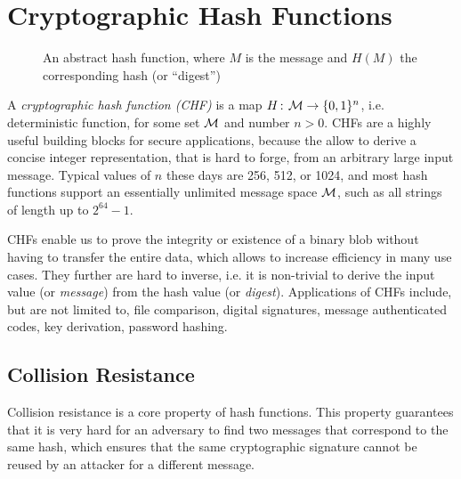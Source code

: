 \section{Cryptographic Hash Functions}
\label{sec:hashfunctions}

\begin{figure}
  \centering
    \caption{An abstract hash function, where $M$ is the message and $H(M)$ the corresponding hash (or ``digest'')}
\label{fig:hash-function}
\end{figure}

A \emph{cryptographic hash function (CHF)} is a map $H{{\kern .05em}\colon{\kern .05em}}{\cal M}\rightarrow\{0,1\}^n$, i.e. deterministic function, for
some set ${\cal M}$ and number $n > 0$. 
CHFs are a highly useful building blocks for secure applications, because the allow to derive a concise integer representation, that is hard to forge, from an arbitrary large input message.
Typical values of $n$ these days are 256, 512, or 1024, and most hash functions support an essentially unlimited message space ${\cal M}$, such as all strings of length up to $2^{64}-1$.

CHFs enable us to prove the integrity or existence of a binary blob without having to transfer the entire data, which allows to increase efficiency in many use cases. They further are hard to inverse, i.e. it is non-trivial to derive the input value (or \emph{message}) from the hash value (or \emph{digest}).
Applications of CHFs include, but are not limited to, file comparison, digital signatures, message authenticated codes, key derivation, password hashing.

\subsection{Collision Resistance}
Collision resistance is a core property of hash functions.
This property guarantees that it is very hard for an adversary to find two messages that correspond to the same hash, which ensures that the same cryptographic signature cannot be reused by an attacker for a different message.

